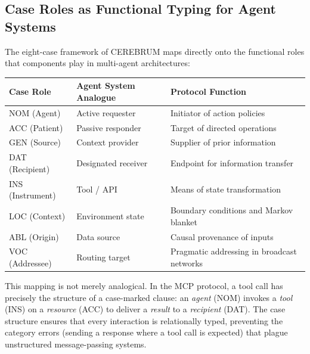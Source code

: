 \documentclass[
]{article}
\newcounter{none} %
\numberwithin{equation}{section}
\begin{document}
\subsection{Case Roles as Functional Typing for Agent
Systems}\label{case-roles-as-functional-typing-for-agent-systems}

The eight-case framework of CEREBRUM \citep{friedman2024cerebrum} maps
directly onto the functional roles that components play in multi-agent
architectures:

{\def\LTcaptype{none} %
\begin{longtable}[]{@{}
  >{\raggedright\arraybackslash}p{}
  >{\raggedright\arraybackslash}p{}
  >{\raggedright\arraybackslash}p{}@{}}
\toprule\noalign{}
\begin{minipage}[b]{\linewidth}\raggedright
Case Role
\end{minipage} & \begin{minipage}[b]{\linewidth}\raggedright
Agent System Analogue
\end{minipage} & \begin{minipage}[b]{\linewidth}\raggedright
Protocol Function
\end{minipage} \\
\midrule\noalign{}
\endhead
\bottomrule\noalign{}
\endlastfoot
NOM (Agent) & Active requester & Initiator of action policies \\
ACC (Patient) & Passive responder & Target of directed operations \\
GEN (Source) & Context provider & Supplier of prior information \\
DAT (Recipient) & Designated receiver & Endpoint for information
transfer \\
INS (Instrument) & Tool / API & Means of state transformation \\
LOC (Context) & Environment state & Boundary conditions and Markov
blanket \\
ABL (Origin) & Data source & Causal provenance of inputs \\
VOC (Addressee) & Routing target & Pragmatic addressing in broadcast
networks \\
\end{longtable}
}

This mapping is not merely analogical. In the MCP protocol, a tool call
has precisely the structure of a case-marked clause: an \emph{agent}
(NOM) invokes a \emph{tool} (INS) on a \emph{resource} (ACC) to deliver
a \emph{result} to a \emph{recipient} (DAT). The case structure ensures
that every interaction is relationally typed, preventing the category
errors (sending a response where a tool call is expected) that plague
unstructured message-passing systems.
\end{document}
